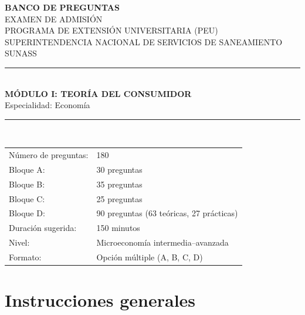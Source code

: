 \documentclass[11pt,a4paper]{article}
\newcommand{\titulo}{BANCO DE PREGUNTAS}
\newcommand{\modulo}{MÓDULO I: TEORÍA DEL CONSUMIDOR}
\begin{document}
\begin{titlepage}
\thispagestyle{empty}
\centering
\backboneportadaheader

{\Large\bfseries \titulo}\\[0.35cm]
{\large EXAMEN DE ADMISIÓN}\\[0.15cm]
{\large PROGRAMA DE EXTENSIÓN UNIVERSITARIA (PEU)}\\[0.15cm]
{\large SUPERINTENDENCIA NACIONAL DE SERVICIOS DE SANEAMIENTO}\\[0.05cm]
{\large SUNASS}\\[1.0cm]

\rule{\linewidth}{0.9pt}\\[0.55cm]
{\LARGE\bfseries \modulo}\\[0.35cm]
{\large Especialidad: Economía}\\[0.55cm]
\rule{\linewidth}{0.9pt}\\[1.0cm]

\begin{tabular}{ll}
\toprule
Número de preguntas: & 180 \\
Bloque A: & 30 preguntas \\
Bloque B: & 35 preguntas \\
Bloque C: & 25 preguntas \\
Bloque D: & 90 preguntas (63 teóricas, 27 prácticas) \\
Duración sugerida: & 150 minutos \\
Nivel: & Microeconomía intermedia--avanzada \\
Formato: & Opción múltiple (A, B, C, D) \\
\bottomrule
\end{tabular}

\vfill
\backboneportadafooter
\end{titlepage}

\section*{Instrucciones generales}
\end{document}
